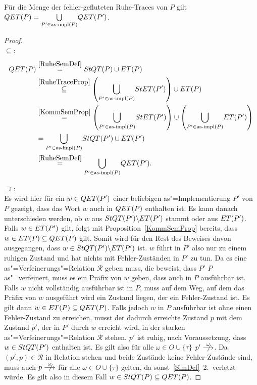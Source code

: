 \begin{Prop}
  Für die Menge der fehler-gefluteten Ruhe-Traces von $P$ gilt $QET (P) =
  \underset{P'\in\mathrm{as}\text{-}\mathrm{impl} (P)}{\bigcup} QET (P')$.
\end{Prop}
\begin{proof}\mbox{}\\
  $\subseteq$:
  \begin{align*}
    QET (P)&\overset{\ref{RuheSemDef}}{=} StQT (P) \cup ET (P)\\
    &\overset{\ref{RuheTraceProp}}{\subseteq} \left(\underset{P'\in\mathrm{as}\text{-}\mathrm{impl}
    (P)}{\bigcup} StET (P')\right)\cup ET (P)\\
    &\overset{\ref{KommSemProp}}{=} \left(\underset{P'\in\mathrm{as}\text{-}\mathrm{impl}
    (P)}{\bigcup} StET (P')\right)\cup \left(\underset{P'\in\mathrm{as}\text{-}\mathrm{impl}
    (P)}{\bigcup} ET (P')\right)\\
    &= \underset{P'\in\mathrm{as}\text{-}\mathrm{impl} (P)}{\bigcup} StQT (P') \cup ET (P')\\
    &\overset{\ref{RuheSemDef}}{=} \underset{P'\in\mathrm{as}\text{-}\mathrm{impl} (P)}{\bigcup} QET
    (P').\\
  \end{align*}

  $\supseteq$:\\
  Es wird hier für ein $w\in QET (P')$ einer beliebigen as"=Implementierung
  $P'$ von $P$ gezeigt, dass das Wort $w$ auch in $QET (P)$ enthalten ist. Es
  kann danach unterschieden werden, ob $w$ aus $StQT (P')\backslash ET (P')$
  stammt oder aus $ET (P')$. Falls $w\in ET (P')$ gilt, folgt mit
  Proposition~\ref{KommSemProp} bereits, dass $w\in ET (P) \subseteq QET (P)$
  gilt. Somit wird für den Rest des Beweises davon ausgegangen, dass $w\in StQT
  (P')\backslash ET (P')$ ist. $w$ führt in $P'$ also nur zu einem ruhigen
  Zustand und hat nichts mit Fehler-Zuständen in $P'$ zu tun. Da es eine
  as"=Verfeinerungs"=Relation $\mathcal{R}$ geben muss, die beweist, dass $P'$
  $P$ as"=verfeinert, muss es ein Präfix von $w$ geben, dass auch in $P$
  ausführbar ist. Falls $w$ nicht vollständig ausführbar ist in $P$, muss auf
  dem Weg, auf dem das Präfix von $w$ ausgeführt wird ein Zustand liegen, der
  ein Fehler-Zustand ist. Es gilt dann $w\in ET (P)\subseteq QET (P)$. Falls
  jedoch $w$ in $P$ ausführbar ist ohne einen Fehler-Zustand zu erreichen,
  musst der dadurch erreichte Zustand $p$ mit dem Zustand $p'$, der in $P'$
  durch $w$ erreicht wird, in der starken as"=Verfeinerungs"=Relation
  $\mathcal{R}$ stehen. $p'$ ist ruhig, nach Voraussetzung, dass $w\in StQT
  (P')$ enthalten ist. Es gilt also für alle $\omega\in O\cup\{\tau\}$
  $p'\nmust[\omega]$. Da $(p',p) \in\mathcal{R}$ in Relation stehen und beide
  Zustände keine Fehler-Zustände sind, muss auch $p\nmust[\omega]$ für alle
  $\omega\in O\cup \{\tau\}$ gelten, da sonst~\ref{SimDef}~2.\ verletzt würde.
  Es gilt also in diesem Fall $w\in StQT (P)\subseteq QET (P)$.
\end{proof}

